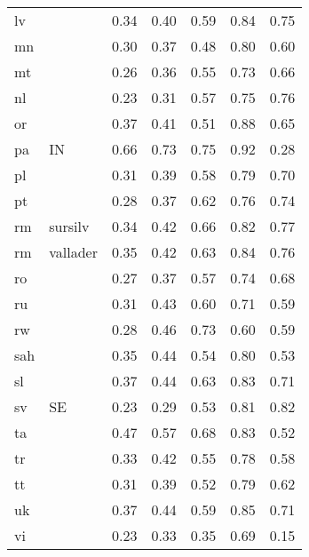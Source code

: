 \begin{table}[H]
\begin{tabular}{llrrrrr}
  lv &  & 0.34 & 0.40 & 0.59 & 0.84 & 0.75 \\ 
  mn &  & 0.30 & 0.37 & 0.48 & 0.80 & 0.60 \\ 
  mt &  & 0.26 & 0.36 & 0.55 & 0.73 & 0.66 \\ 
  nl &  & 0.23 & 0.31 & 0.57 & 0.75 & 0.76 \\ 
  or &  & 0.37 & 0.41 & 0.51 & 0.88 & 0.65 \\ 
  pa & IN & 0.66 & 0.73 & 0.75 & 0.92 & 0.28 \\ 
  pl &  & 0.31 & 0.39 & 0.58 & 0.79 & 0.70 \\ 
  pt &  & 0.28 & 0.37 & 0.62 & 0.76 & 0.74 \\ 
  rm & sursilv & 0.34 & 0.42 & 0.66 & 0.82 & 0.77 \\ 
  rm & vallader & 0.35 & 0.42 & 0.63 & 0.84 & 0.76 \\ 
  ro &  & 0.27 & 0.37 & 0.57 & 0.74 & 0.68 \\ 
  ru &  & 0.31 & 0.43 & 0.60 & 0.71 & 0.59 \\ 
  rw &  & 0.28 & 0.46 & 0.73 & 0.60 & 0.59 \\ 
  sah &  & 0.35 & 0.44 & 0.54 & 0.80 & 0.53 \\ 
  sl &  & 0.37 & 0.44 & 0.63 & 0.83 & 0.71 \\ 
  sv & SE & 0.23 & 0.29 & 0.53 & 0.81 & 0.82 \\ 
  ta &  & 0.47 & 0.57 & 0.68 & 0.83 & 0.52 \\ 
  tr &  & 0.33 & 0.42 & 0.55 & 0.78 & 0.58 \\ 
  tt &  & 0.31 & 0.39 & 0.52 & 0.79 & 0.62 \\ 
  uk &  & 0.37 & 0.44 & 0.59 & 0.85 & 0.71 \\ 
  vi &  & 0.23 & 0.33 & 0.35 & 0.69 & 0.15 \\ 
   \hline
\end{tabular}
\end{table}
